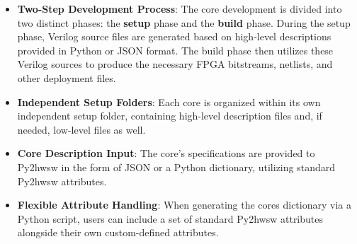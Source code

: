 %

\begin{itemize}
    \item \textbf{Two-Step Development Process}: The core development is divided
    into two distinct phases: the \textbf{setup} phase and the \textbf{build}
    phase. During the setup phase, Verilog source files are generated based on
    high-level descriptions provided in Python or JSON format. The build phase then
    utilizes these Verilog sources to produce the necessary FPGA bitstreams,
    netlists, and other deployment files.

    \item \textbf{Independent Setup Folders}: Each core is organized within its own
    independent setup folder, containing high-level description files and, if
    needed, low-level files as well.

    \item \textbf{Core Description Input}: The core's specifications are provided
    to Py2hwsw in the form of JSON or a Python dictionary, utilizing standard
    Py2hwsw attributes.

    \item \textbf{Flexible Attribute Handling}: When generating the cores
    dictionary via a Python script, users can include a set of standard Py2hwsw
    attributes alongside their own custom-defined attributes.
\end{itemize}
